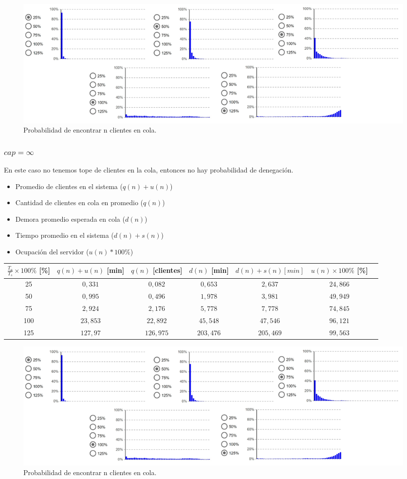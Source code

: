 \begin{figure}[H]
  \includegraphics[width=\linewidth]{images/anylogic-colas-50}
  \caption{Probabilidad de encontrar n clientes en cola.}
\end{figure}

\subsubsection[cap = ∞]{$cap = \infty$}

En este caso no tenemos tope de clientes en la cola, entonces no hay probabilidad de denegación.

\begin{itemize}
    \item Promedio de clientes en el sistema ($q(n)+u(n)$)
    \item Cantidad de clientes en cola en promedio ($q(n)$)
    \item Demora promedio esperada en cola ($d(n)$)
    \item Tiempo promedio en el sistema ($d(n)+s(n)$)
    \item Ocupación del servidor ($u(n)*100\%$)
\end{itemize}

\begin{tabular}{||c||c|c|c|c|c|c||}
    \hline \hline
    $\frac{T_a}{T_s}\times100\%$ [\%] & $q(n)+u(n)$ [min] & $q(n)$ [clientes] & $d(n)$ [min] & $d(n)+s(n) [min]$ & $u(n)\times100\%$ [\%]\\
    \hline \hline
    25 & $0,331$ & $0,082$ & $0,653$ & $2,637$ & $24,866$ \\
    \hline
    50 & $0,995$ & $0,496$ & $1,978$ & $3,981$ & $49,949$ \\
    \hline
    75 & $2,924$ & $2,176$ & $5,778$ & $7,778$ & $74,845$ \\
    \hline
    100 & $23,853$ & $22,892$ & $45,548$ & $47,546$ & $96,121$ \\
    \hline
    125 & $127,97$ & $126,975$ & $203,476$ & $205,469$ & $99,563$ \\
    \hline \hline
\end{tabular}

\begin{figure}[H]
  \includegraphics[width=\linewidth]{images/anylogic-colas-50}
  \caption{Probabilidad de encontrar n clientes en cola.}
\end{figure}

